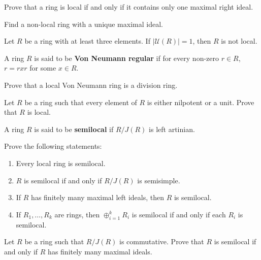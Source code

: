 \begin{exercise}
\label{xca:local_right}
    Prove that a ring is local if and only if it contains only one maximal right ideal.
\end{exercise}

\begin{exercise}
\label{xca:non_local1}
    Find a non-local ring with a unique maximal ideal. 
\end{exercise}

\begin{exercise}
\label{xca:non_local2}
    Let $R$ be a ring with at least three elements. 
    If $|\mathcal{U}(R)|=1$, then $R$ is not local. 
\end{exercise}

A ring $R$ is said to be \textbf{Von Neumann regular} if  
for every non-zero $r\in R$, $r=rxr$ for some $x\in R$. 

\begin{exercise}
\label{xca:VonNeumann_local}
    Prove that a local Von Neumann ring is a division ring. 
\end{exercise}

\begin{exercise}
\label{xca:nilp_or_unit}
    Let $R$ be a ring such that every element of $R$ is either 
    nilpotent or a unit. Prove that $R$ is local. 
\end{exercise}

A ring $R$ is said to be \textbf{semilocal} if $R/J(R)$ is left artinian. 

\begin{exercise}
\label{xca:semilocal}
    Prove the following statements:
    \begin{enumerate}
        \item Every local ring is semilocal.
        \item $R$ is semilocal if and only if $R/J(R)$ is semisimple.
        \item If $R$ has finitely many maximal left ideals, then $R$ is semilocal. 
        \item If $R_1,\dots,R_k$ are rings, then $\oplus_{i=1}^k R_i$ is semilocal
            if and only if each $R_i$ is semilocal. 
    \end{enumerate}
\end{exercise}

\begin{example}
\label{xca:semilocal_commutative}
    Let $R$ be a ring such that $R/J(R)$ is commutative. Prove
    that $R$ is semilocal if and only if $R$ has finitely many maximal ideals. 
\end{example}

